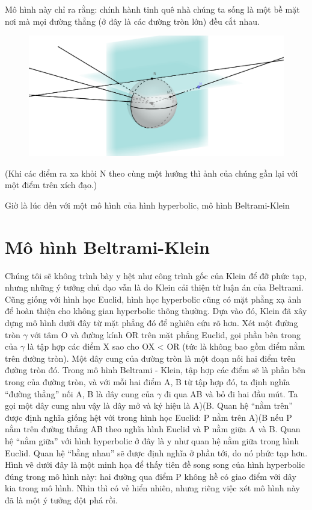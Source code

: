 	
Mô hình này chỉ ra rằng: chính hành tinh quê nhà chúng ta sống là một bề mặt nơi mà mọi đường thẳng (ở đây là các đường tròn lớn) đều cắt nhau.

\begin{figure}[ht]
\includegraphics[width=\textwidth]{Stereographic_projection.png}
\end{figure}

(Khi các điểm ra xa khỏi N theo cùng một hướng thì ảnh của chúng gần lại với một điểm trên xích đạo.)

Giờ là lúc đến với một mô hình của hình hyperbolic, mô hình Beltrami-Klein

\section{Mô hình Beltrami-Klein}
Chúng tôi sẽ không trình bày y hệt như công trình gốc của Klein để đỡ phức tạp, nhưng những ý tưởng chủ đạo vẫn là do Klein cải thiện từ luận án của Beltrami.
Cũng giống với hình học Euclid, hình học hyperbolic cũng có mặt phẳng xạ ảnh để hoàn thiện cho không gian hyperbolic thông thường. Dựa vào đó, Klein đã xây dựng mô hình dưới đây từ mặt phẳng đó để nghiên cứu rõ hơn.
Xét một đường tròn $\gamma$ với tâm O và đường kính OR trên mặt phẳng Euclid, gọi phần bên trong của $ \gamma$ là tập hợp các điểm X sao cho OX < OR (tức là không bao gồm điểm nằm trên đường tròn). Một dây cung của đường tròn là một đoạn nối hai điểm trên đường tròn đó.
Trong mô hình Beltrami - Klein, tập hợp các điểm sẽ là phần bên trong của đường tròn, và với mỗi hai điểm A, B từ tập hợp đó, ta định nghĩa ``đường thẳng'' nối A, B là dây cung của $ \gamma$ đi qua AB và bỏ đi hai đầu mút. Ta gọi một dây cung nhu vậy là dây mở và ký hiệu là A)(B. Quan hệ ``nằm trên'' được định nghĩa giống hệt với trong hình học Euclid: P nằm trên A)(B nếu P nằm trên đường thẳng AB theo nghĩa hình Euclid và P nằm giữa A và B. Quan hệ ``nằm giữa'' với hình hyperbolic ở đây là y như quan hệ nằm giữa trong hình Euclid. Quan hệ ``bằng nhau'' sẽ được định nghĩa ở phần tới, do nó phức tạp hơn.
Hình vẽ dưới đây là một minh họa để thấy tiên đề song song của hình hyperbolic đúng trong mô hình này: hai đường qua điểm P không hề có giao điểm với dây kia trong mô hình. Nhìn thì có vẻ hiển nhiên, nhưng riêng việc xét mô hình này đã là một ý tưởng đột phá rồi. 


